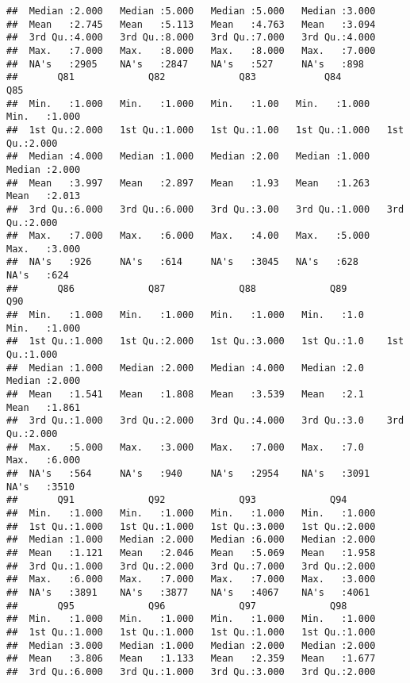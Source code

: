 \documentclass[
]{article}
\begin{document}
\begin{verbatim}
##  Median :2.000   Median :5.000   Median :5.000   Median :3.000  
##  Mean   :2.745   Mean   :5.113   Mean   :4.763   Mean   :3.094  
##  3rd Qu.:4.000   3rd Qu.:8.000   3rd Qu.:7.000   3rd Qu.:4.000  
##  Max.   :7.000   Max.   :8.000   Max.   :8.000   Max.   :7.000  
##  NA's   :2905    NA's   :2847    NA's   :527     NA's   :898    
##       Q81             Q82             Q83            Q84             Q85       
##  Min.   :1.000   Min.   :1.000   Min.   :1.00   Min.   :1.000   Min.   :1.000  
##  1st Qu.:2.000   1st Qu.:1.000   1st Qu.:1.00   1st Qu.:1.000   1st Qu.:2.000  
##  Median :4.000   Median :1.000   Median :2.00   Median :1.000   Median :2.000  
##  Mean   :3.997   Mean   :2.897   Mean   :1.93   Mean   :1.263   Mean   :2.013  
##  3rd Qu.:6.000   3rd Qu.:6.000   3rd Qu.:3.00   3rd Qu.:1.000   3rd Qu.:2.000  
##  Max.   :7.000   Max.   :6.000   Max.   :4.00   Max.   :5.000   Max.   :3.000  
##  NA's   :926     NA's   :614     NA's   :3045   NA's   :628     NA's   :624    
##       Q86             Q87             Q88             Q89            Q90       
##  Min.   :1.000   Min.   :1.000   Min.   :1.000   Min.   :1.0    Min.   :1.000  
##  1st Qu.:1.000   1st Qu.:2.000   1st Qu.:3.000   1st Qu.:1.0    1st Qu.:1.000  
##  Median :1.000   Median :2.000   Median :4.000   Median :2.0    Median :2.000  
##  Mean   :1.541   Mean   :1.808   Mean   :3.539   Mean   :2.1    Mean   :1.861  
##  3rd Qu.:1.000   3rd Qu.:2.000   3rd Qu.:4.000   3rd Qu.:3.0    3rd Qu.:2.000  
##  Max.   :5.000   Max.   :3.000   Max.   :7.000   Max.   :7.0    Max.   :6.000  
##  NA's   :564     NA's   :940     NA's   :2954    NA's   :3091   NA's   :3510   
##       Q91             Q92             Q93             Q94       
##  Min.   :1.000   Min.   :1.000   Min.   :1.000   Min.   :1.000  
##  1st Qu.:1.000   1st Qu.:1.000   1st Qu.:3.000   1st Qu.:2.000  
##  Median :1.000   Median :2.000   Median :6.000   Median :2.000  
##  Mean   :1.121   Mean   :2.046   Mean   :5.069   Mean   :1.958  
##  3rd Qu.:1.000   3rd Qu.:2.000   3rd Qu.:7.000   3rd Qu.:2.000  
##  Max.   :6.000   Max.   :7.000   Max.   :7.000   Max.   :3.000  
##  NA's   :3891    NA's   :3877    NA's   :4067    NA's   :4061   
##       Q95             Q96             Q97             Q98       
##  Min.   :1.000   Min.   :1.000   Min.   :1.000   Min.   :1.000  
##  1st Qu.:1.000   1st Qu.:1.000   1st Qu.:1.000   1st Qu.:1.000  
##  Median :3.000   Median :1.000   Median :2.000   Median :2.000  
##  Mean   :3.806   Mean   :1.133   Mean   :2.359   Mean   :1.677  
##  3rd Qu.:6.000   3rd Qu.:1.000   3rd Qu.:3.000   3rd Qu.:2.000  

\end{verbatim}
\end{document}
